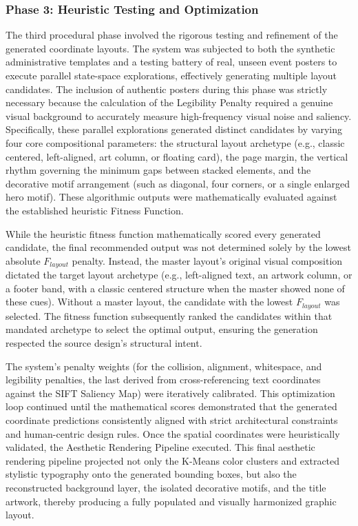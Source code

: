 \begin{refsection}
\subsubsection{Phase 3: Heuristic Testing and Optimization}
The third procedural phase involved the rigorous testing and refinement of the generated coordinate layouts. The system was subjected to both the synthetic administrative templates and a testing battery of real, unseen event posters to execute parallel state-space explorations, effectively generating multiple layout candidates. The inclusion of authentic posters during this phase was strictly necessary because the calculation of the Legibility Penalty required a genuine visual background to accurately measure high-frequency visual noise and saliency. Specifically, these parallel explorations generated distinct candidates by varying four core compositional parameters: the structural layout archetype (e.g., classic centered, left-aligned, art column, or floating card), the page margin, the vertical rhythm governing the minimum gaps between stacked elements, and the decorative motif arrangement (such as diagonal, four corners, or a single enlarged hero motif). These algorithmic outputs were mathematically evaluated against the established heuristic Fitness Function. 

While the heuristic fitness function mathematically scored every generated candidate, the final recommended output was not determined solely by the lowest absolute $F_{layout}$ penalty. Instead, the master layout's original visual composition dictated the target layout archetype (e.g., left-aligned text, an artwork column, or a footer band, with a classic centered structure when the master showed none of these cues). Without a master layout, the candidate with the lowest $F_{layout}$ was selected. The fitness function subsequently ranked the candidates within that mandated archetype to select the optimal output, ensuring the generation respected the source design's structural intent.

The system’s penalty weights (for the collision, alignment, whitespace, and legibility penalties, the last derived from cross-referencing text coordinates against the SIFT Saliency Map) were iteratively calibrated. This optimization loop continued until the mathematical scores demonstrated that the generated coordinate predictions consistently aligned with strict architectural constraints and human-centric design rules. Once the spatial coordinates were heuristically validated, the Aesthetic Rendering Pipeline executed. This final aesthetic rendering pipeline projected not only the K-Means color clusters and extracted stylistic typography onto the generated bounding boxes, but also the reconstructed background layer, the isolated decorative motifs, and the title artwork, thereby producing a fully populated and visually harmonized graphic layout.




\end{refsection}
